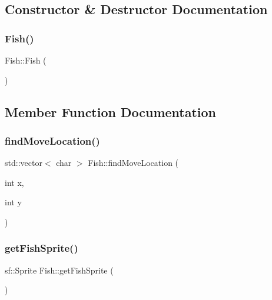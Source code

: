 \subsection{Constructor \& Destructor Documentation}
\mbox{\label{class_fish_a265fa9dc23037b5f621ff5f2b2731e9b}} 
\subsubsection{\texorpdfstring{Fish()}{Fish()}}
{\footnotesize\ttfamily Fish\+::\+Fish (\begin{DoxyParamCaption}{ }\end{DoxyParamCaption})}



\subsection{Member Function Documentation}
\mbox{\label{class_fish_a89b819c754df5cdfd6b403aac953d826}} 
\subsubsection{\texorpdfstring{find\+Move\+Location()}{findMoveLocation()}}
{\footnotesize\ttfamily std\+::vector$<$ char $>$ Fish\+::find\+Move\+Location (\begin{DoxyParamCaption}\item[{int}]{x,  }\item[{int}]{y }\end{DoxyParamCaption})}

\mbox{\label{class_fish_ae23421c4d781b462050c28d085701383}} 
\subsubsection{\texorpdfstring{get\+Fish\+Sprite()}{getFishSprite()}}
{\footnotesize\ttfamily sf\+::\+Sprite Fish\+::get\+Fish\+Sprite (\begin{DoxyParamCaption}{ }\end{DoxyParamCaption})}

